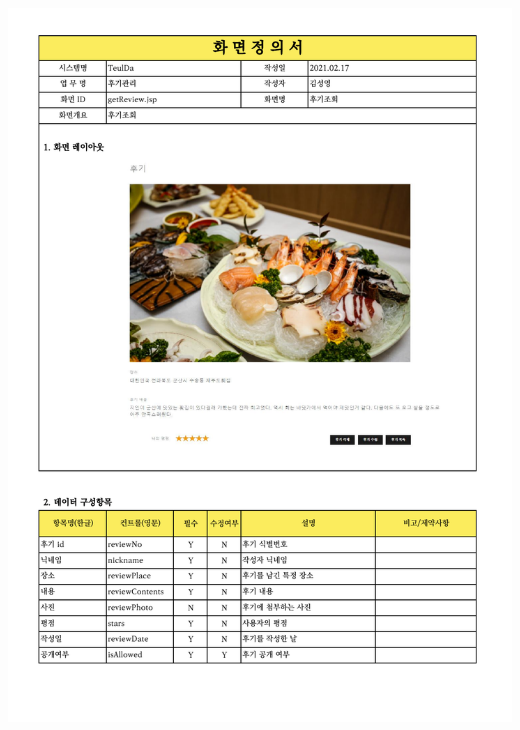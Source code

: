 {{{{{{{{{{{{{{{{{{{{{{{{{{{{{{{{{{{{{{{{{{{{{{{{{{{{{{{{{{{{{{{{{{{{{{{{\includegraphics[width=20cm]{./Figure/Design/Display/review/review_03.pdf} \\
}}}}}}}}}}}}}}}}}}}}}}}}}}}}}}}}}}}}}}}}}}}}}}}}}}}}}}}}}}}}}}}}}}}}}}}}
